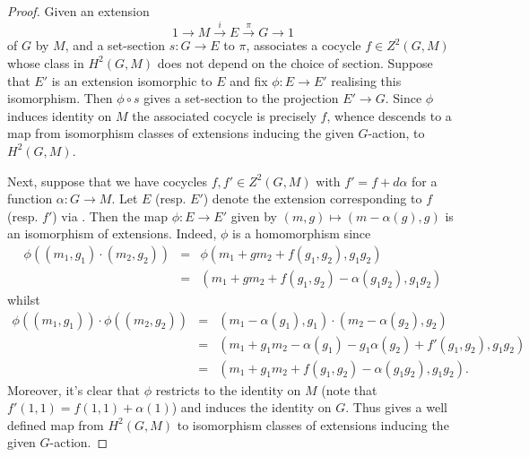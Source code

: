 \documentclass[11pt]{amsart}
\numberwithin{equation}{section}
\theoremstyle{remark}
\theoremstyle{remark}
\theoremstyle{remark}
\theoremstyle{definition}
\theoremstyle{definition}
\theoremstyle{definition}
\theoremstyle{definition}
\theoremstyle{definition}
\theoremstyle{definition}
\begin{document}
\begin{proof}
Given an extension 
\[1\longrightarrow M \stackrel{i}{\longrightarrow}E \stackrel{\pi}{\longrightarrow}G\longrightarrow 1\]
 of $G$ by $M$, and a set-section $s:G\rightarrow E$ to $\pi$,  associates a cocycle $f\in Z^2(G,M)$ whose class in $H^2(G,M)$ does not depend on the choice of section. Suppose that $E'$ is an extension isomorphic to $E$ and fix $\phi:E\rightarrow E'$ realising this isomorphism. Then $\phi \circ s$ gives a set-section to the projection $E'\rightarrow G$. Since $\phi$ induces identity on $M$  the associated cocycle is precisely $f$, whence  descends to a map from isomorphism classes of extensions inducing the given $G$-action, to $H^2(G,M)$.
 
Next, suppose that we have  cocycles $f,f'\in Z^2(G,M)$ with $f'=f+d\alpha$ for a function $\alpha:G\rightarrow M$. Let $E$ (resp. $E'$) denote the extension corresponding to $f$ (resp. $f'$) via . Then the map $\phi:E\rightarrow E'$ given by $(m,g)\mapsto (m-\alpha(g),g)$ is an isomorphism of extensions. Indeed, $\phi$ is a homomorphism since
\begin{eqnarray*}\phi\left((m_1,g_1)\cdot (m_2,g_2)\right)&=&\phi\left(m_1+gm_2+f(g_1,g_2),g_1g_2\right)\\
&=&(m_1+gm_2+f(g_1,g_2)-\alpha(g_1g_2),g_1g_2)\end{eqnarray*}
whilst 
\begin{eqnarray*}\phi\left((m_1,g_1)\right)\cdot \phi\left((m_2,g_2)\right)&=&(m_1-\alpha(g_1),g_1)\cdot (m_2-\alpha(g_2),g_2)\\
&=&(m_1+g_1m_2-\alpha(g_1)-g_1\alpha(g_2)+f'(g_1,g_2),g_1g_2)\\&=&\left(m_1+g_1m_2+f(g_1,g_2)-\alpha(g_1g_2),g_1g_2\right).\end{eqnarray*}
Moreover, it's clear that $\phi$ restricts to the identity on $M$ (note that $f'(1,1)=f(1,1)+\alpha(1)$) and induces the identity on $G$. Thus  gives a well defined map from $H^2(G,M)$ to isomorphism classes of extensions inducing the given $G$-action.
 

\end{proof}
\end{document}
